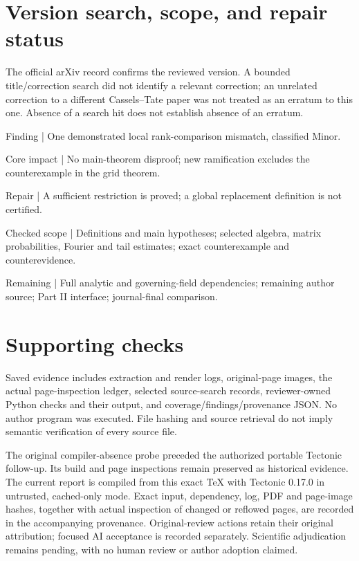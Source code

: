 \documentclass[10pt]{article}
\begin{document}
\section*{Version search, scope, and repair status}
The official arXiv record confirms the reviewed version. A bounded title/correction search did not identify a relevant correction; an unrelated correction to a different Cassels–Tate paper was not treated as an erratum to this one. Absence of a search hit does not establish absence of an erratum.\par
Finding | One demonstrated local rank-comparison mismatch, classified Minor.\par
Core impact | No main-theorem disproof; new ramification excludes the counterexample in the grid theorem.\par
Repair | A sufficient restriction is proved; a global replacement definition is not certified.\par
Checked scope | Definitions and main hypotheses; selected algebra, matrix probabilities, Fourier and tail estimates; exact counterexample and counterevidence.\par
Remaining | Full analytic and governing-field dependencies; remaining author source; Part II interface; journal-final comparison.\par
\section*{Supporting checks}
Saved evidence includes extraction and render logs, original-page images, the actual page-inspection ledger, selected source-search records, reviewer-owned Python checks and their output, and coverage/findings/provenance JSON. No author program was executed. File hashing and source retrieval do not imply semantic verification of every source file.\par
The original compiler-absence probe preceded the authorized portable Tectonic follow-up. Its build and page inspections remain preserved as historical evidence. The current report is compiled from this exact TeX with Tectonic 0.17.0 in untrusted, cached-only mode. Exact input, dependency, log, PDF and page-image hashes, together with actual inspection of changed or reflowed pages, are recorded in the accompanying provenance. Original-review actions retain their original attribution; focused AI acceptance is recorded separately. Scientific adjudication remains pending, with no human review or author adoption claimed.\par
\end{document}
